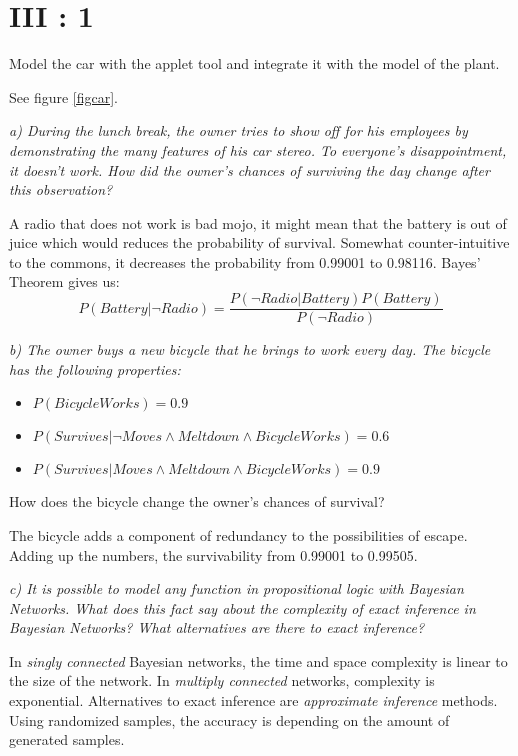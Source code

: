 \section{III : 1}
\begin{framed}Model the car with the applet tool and integrate it with the model of the plant.\end{framed}

See figure \ref{figcar}.


\begin{framed}\em a) During the lunch break, the owner tries to show off for his employees by demonstrating the many features of his car stereo. To everyone's disappointment, it doesn't work. How did the owner's chances of surviving the day change after this observation?\em\end{framed}

A radio that does not work is bad mojo, it might mean that the battery is out of juice which would reduces the probability of survival. Somewhat counter-intuitive to the commons, it decreases the probability from 0.99001 to 0.98116. Bayes' Theorem gives us: $$P(Battery|\neg Radio) = \frac{P(\neg Radio|Battery)P(Battery)}{P(\neg Radio)}$$

\begin{framed}\em b) The owner buys a new bicycle that he brings to work every day. The bicycle has the following properties:
\begin{itemize}
  \item $P(BicycleWorks) = 0.9$
  \item $P(Survives | \neg Moves \land Meltdown \land BicycleWorks) = 0.6$
  \item $P(Survives | Moves \land Meltdown \land BicycleWorks) = 0.9$
\end{itemize}
How does the bicycle change the owner's chances of survival? \em\end{framed}

The bicycle adds a component of redundancy to the possibilities of escape. Adding up the numbers, the survivability from 0.99001 to 0.99505.

\begin{framed}\em c) It is possible to model any function in propositional logic with Bayesian Networks. What does this fact say about the complexity of exact inference in Bayesian Networks? What alternatives are there to exact inference? \em\end{framed}

In \emph{singly connected} Bayesian networks, the time and space complexity is linear to the size of the network. In \emph{multiply connected} networks, complexity is exponential. Alternatives to exact inference are \emph{approximate inference} methods. Using randomized samples, the accuracy is depending on the amount of generated samples.

